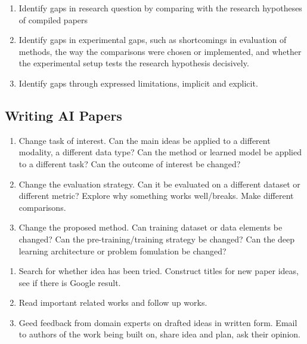 \begin{remark} 
\begin{enumerate}[label=\roman*.]
\setlength{\itemsep}{0pt}
\item Identify gaps in research question by comparing with the research hypotheses of compiled papers
\item Identify gaps in experimental gaps, such as shortcomings in evaluation of methods, the way the comparisons were chosen or implemented, and whether the experimental setup tests the research hypothesis decisively.
\item Identify gaps through expressed limitations, implicit and explicit.
\end{enumerate}
\end{remark}

\newpage

\subsection{Writing AI Papers}

\begin{remark} 
\begin{enumerate}[label=\roman*.]
\setlength{\itemsep}{0pt}
\item Change task of interest. Can the main ideas be applied to a different modality, a different data type? Can the method or learned model be applied to a different task? Can the outcome of interest be changed?
\item Change the evaluation strategy. Can it be evaluated on a different dataset or different metric? Explore why something works well/breaks. Make different comparisons.
\item Change the proposed method. Can training dataset or data elements be changed? Can the pre-training/training strategy be changed? Can the deep learning architecture or problem fomulation be changed?
\end{enumerate}
\end{remark}

\begin{remark} 
\begin{enumerate}[label=\roman*.]
\setlength{\itemsep}{0pt}
\item Search for whether idea has been tried. Construct titles for new paper ideas, see if there is Google result.
\item Read important related works and follow up works.
\item Geed feedback from domain experts on drafted ideas in written form. Email to authors of the work being built on, share idea and plan, ask their opinion.
\end{enumerate}
\end{remark}

